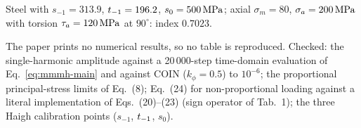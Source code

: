  Steel with $s_{-1}=313.9$, $t_{-1}=196.2$, $s_0=500\,\mathrm{MPa}$; axial $\sigma_m=80$,
$\sigma_a=200\,\mathrm{MPa}$ with torsion $\tau_a=120\,\mathrm{MPa}$ at $90^\circ$: index $0.7023$.

 The paper prints no numerical results, so no table is reproduced. Checked: the
single-harmonic amplitude against a 20\,000-step time-domain evaluation of
Eq.~\eqref{eq:mmmh-main} and against COIN ($k_\phi=0.5$) to $10^{-6}$; the proportional principal-stress
limits of Eq.~(8); Eq.~(24) for non-proportional loading against a literal implementation of
Eqs.~(20)--(23) (sign operator of Tab.~1); the three Haigh calibration points ($s_{-1}$, $t_{-1}$, $s_0$).
